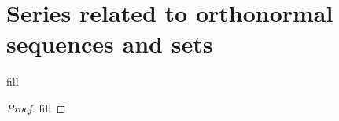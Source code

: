 \section{Series related to orthonormal sequences and sets}

\begin{exercise}{1}
fill
\end{exercise}
\begin{proof}
fill
\end{proof}